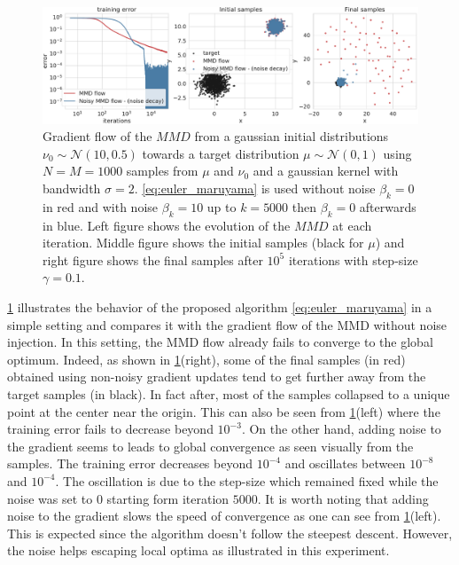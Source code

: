 \begin{figure}[ht]
	\centering
	\includegraphics[width=0.8\linewidth]{figures/Gaussians_error_4}
	\caption{Gradient flow of the $MMD$ from a gaussian initial distributions $\nu_0\sim \mathcal{N}(10,0.5)$  towards a target distribution $\mu\sim \mathcal{N}(0,1)$ using $N=M=1000$ samples from $\mu$ and $\nu_0$ and a gaussian kernel with bandwidth $\sigma = 2 $. \cref{eq:euler_maruyama} is used 
	without noise $\beta_k = 0$ in red and  with noise $\beta_k = 10$ up to $k=5000$ then $\beta_k = 0$ afterwards in blue. 
	Left figure shows the evolution of the $MMD$ at each iteration. Middle figure shows the initial samples (black for $\mu$) and right figure shows the final samples after $10^5$ iterations with step-size $\gamma = 0.1$.}
	\label{fig:experiments}
\end{figure}
\cref{fig:experiments} illustrates the behavior of the proposed algorithm \cref{eq:euler_maruyama} in a simple setting and compares it with the gradient flow of the MMD without noise injection. In this setting, the MMD flow already fails to converge to the global optimum. Indeed, as shown in \cref{fig:experiments}(right), some of the final samples (in red) obtained using non-noisy gradient updates tend to get further away from the target samples (in black). In fact after, most of the samples collapsed to a unique point at the center near the origin. This can also be seen from \cref{fig:experiments}(left) where the training error fails to decrease beyond $10^{-3}$. On the other hand, adding noise to the gradient seems to leads to global convergence as seen visually from the samples. The training error decreases beyond $10^{-4}$ and oscillates between $10^{-8}$ and $10^{-4}$. The oscillation is due to the step-size which remained fixed while the noise was set to $0$ starting form iteration $5000$. It is worth noting that adding noise to the gradient slows the speed of convergence as one can see from \cref{fig:experiments}(left). This is expected since the algorithm doesn't follow the steepest descent. However, the noise helps escaping local optima as  illustrated in this experiment.
